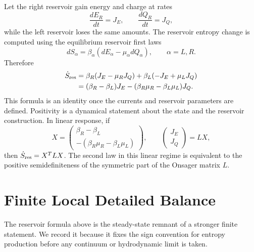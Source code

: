 Let the right reservoir gain energy and charge at rates
\[
  \frac{dE_R}{dt}=J_E,\qquad
  \frac{dQ_R}{dt}=J_Q,
\]
while the left reservoir loses the same amounts.  The reservoir entropy
change is computed using the equilibrium reservoir first laws
\[
  dS_\alpha=\beta_\alpha(dE_\alpha-\mu_\alpha dQ_\alpha),
  \qquad
  \alpha=L,R.
\]
Therefore
\begin{align}
  \dot S_{\rm res}
  &=
  \beta_R(J_E-\mu_RJ_Q)
  +\beta_L(-J_E+\mu_LJ_Q)
  \nonumber\\
  &=
  (\beta_R-\beta_L)J_E
  -(\beta_R\mu_R-\beta_L\mu_L)J_Q .
  \label{eq:ness-reservoir-entropy-production}
\end{align}
This formula is an identity once the currents and reservoir parameters are
defined.  Positivity is a dynamical statement about the state and the
reservoir construction.  In linear response, if
\[
  X=
  \begin{pmatrix}
    \beta_R-\beta_L\\
    -(\beta_R\mu_R-\beta_L\mu_L)
  \end{pmatrix},
  \qquad
  \begin{pmatrix}J_E\\ J_Q\end{pmatrix}
  =
  L X,
\]
then \(\dot S_{\rm res}=X^TLX\).  The second law in this linear regime is
equivalent to the positive semidefiniteness of the symmetric part of the
Onsager matrix \(L\).

\section{Finite Local Detailed Balance}
\label{sec:finite-local-detailed-balance-ness}

The reservoir formula above is the steady-state remnant of a stronger
finite statement.  We record it because it fixes the sign convention for
entropy production before any continuum or hydrodynamic limit is taken.


